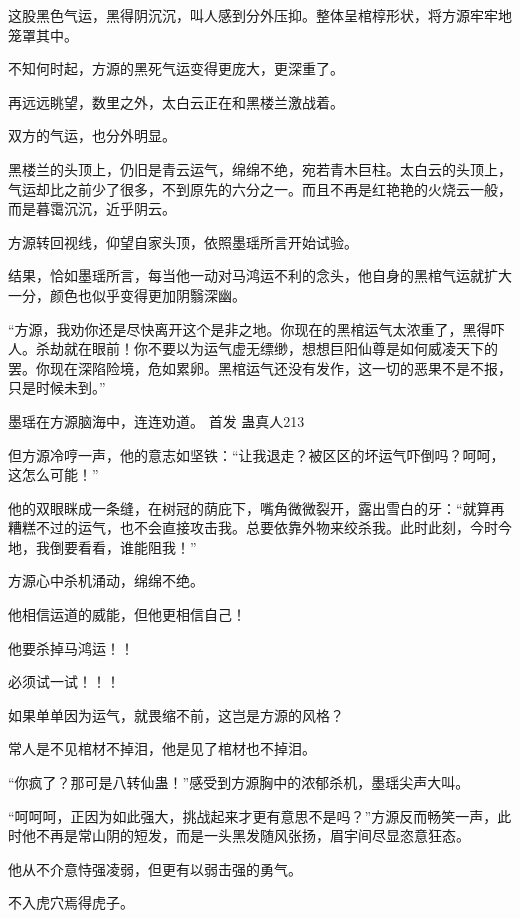 
\begin{this_body}

这股黑色气运，黑得阴沉沉，叫人感到分外压抑。整体呈棺椁形状，将方源牢牢地笼罩其中。

不知何时起，方源的黑死气运变得更庞大，更深重了。

再远远眺望，数里之外，太白云正在和黑楼兰激战着。

双方的气运，也分外明显。

黑楼兰的头顶上，仍旧是青云运气，绵绵不绝，宛若青木巨柱。太白云的头顶上，气运却比之前少了很多，不到原先的六分之一。而且不再是红艳艳的火烧云一般，而是暮霭沉沉，近乎阴云。

方源转回视线，仰望自家头顶，依照墨瑶所言开始试验。

结果，恰如墨瑶所言，每当他一动对马鸿运不利的念头，他自身的黑棺气运就扩大一分，颜色也似乎变得更加阴翳深幽。

“方源，我劝你还是尽快离开这个是非之地。你现在的黑棺运气太浓重了，黑得吓人。杀劫就在眼前！你不要以为运气虚无缥缈，想想巨阳仙尊是如何威凌天下的罢。你现在深陷险境，危如累卵。黑棺运气还没有发作，这一切的恶果不是不报，只是时候未到。”

墨瑶在方源脑海中，连连劝道。  首发 蛊真人213

但方源冷哼一声，他的意志如坚铁：“让我退走？被区区的坏运气吓倒吗？呵呵，这怎么可能！”

他的双眼眯成一条缝，在树冠的荫庇下，嘴角微微裂开，露出雪白的牙：“就算再糟糕不过的运气，也不会直接攻击我。总要依靠外物来绞杀我。此时此刻，今时今地，我倒要看看，谁能阻我！”

方源心中杀机涌动，绵绵不绝。

他相信运道的威能，但他更相信自己！

他要杀掉马鸿运！！

必须试一试！！！

如果单单因为运气，就畏缩不前，这岂是方源的风格？

常人是不见棺材不掉泪，他是见了棺材也不掉泪。

“你疯了？那可是八转仙蛊！”感受到方源胸中的浓郁杀机，墨瑶尖声大叫。

“呵呵呵，正因为如此强大，挑战起来才更有意思不是吗？”方源反而畅笑一声，此时他不再是常山阴的短发，而是一头黑发随风张扬，眉宇间尽显恣意狂态。

他从不介意恃强凌弱，但更有以弱击强的勇气。

不入虎穴焉得虎子。


\end{this_body}
